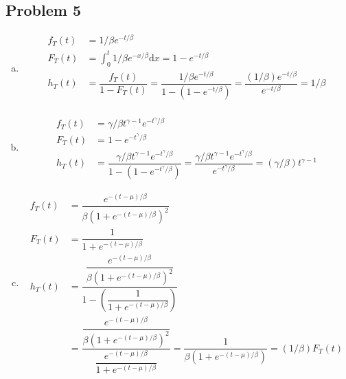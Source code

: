 \documentclass{article}
\newcommand{\dx}{\mathrm{d}x}
\begin{document}
\begin{flushleft}
\section*{Problem 5}
\begin{enumerate}[(a)]
\item 
\begin{align*}
f_T(t)&=1/\beta e^{-t/\beta}\\
F_T(t)&=\int_{0}^{t}1/\beta e^{-x/\beta} \dx =1-e^{-t/\beta}\\
h_T(t)&=\dfrac{f_T(t)}{1-F_T(t)}=\dfrac{1/\beta e^{-t/\beta}}{1-(1-e^{-t/\beta})}=\dfrac{(1/\beta) e^{-t/\beta}}{e^{-t/\beta}}=1/\beta\\
\end{align*}
\item
\begin{align*}
f_T(t)&=\gamma/\beta t^{\gamma-1}e^{-t^\gamma/\beta}\\
F_T(t)&=1-e^{-t^\gamma/\beta}\\
h_T(t)&=\dfrac{\gamma/\beta t^{\gamma-1}e^{-t^\gamma/\beta}}{1-(1-e^{-t^\gamma/\beta})}=\dfrac{\gamma/\beta t^{\gamma-1}e^{-t^\gamma/\beta}}{e^{-t^\gamma/\beta}}=(\gamma/\beta) t^{\gamma-1}
\end{align*}
\item 
\begin{align*}
f_T(t)&=\dfrac{e^{-(t-\mu)/\beta}}{\beta(1+e^{-(t-\mu)/\beta})^2}\\
F_T(t)&=\dfrac{1}{1+e^{-(t-\mu)/\beta}}\\
h_T(t)&=\dfrac{\dfrac{e^{-(t-\mu)/\beta}}{\beta(1+e^{-(t-\mu)/\beta})^2}}{1-(\dfrac{1}{1+e^{-(t-\mu)/\beta}})}\\
&=\dfrac{\dfrac{e^{-(t-\mu)/\beta}}{\beta(1+e^{-(t-\mu)/\beta})^2}}{\dfrac{e^{-(t-\mu)/\beta}}{1+e^{-(t-\mu)/\beta}}}=\dfrac{1}{\beta(1+e^{-(t-\mu)/\beta})}=(1/\beta)F_T(t)
\end{align*}
\end{enumerate}

\end{flushleft}
\end{document}

